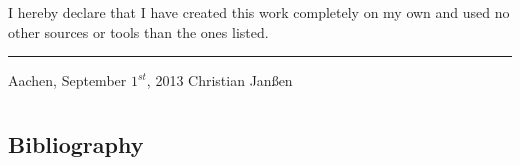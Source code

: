 \documentclass[final,twoside,11pt,titlepage,a4paper,english,bibliography=totocnumbered,listof=numbered]{scrbook}
\newcommand{\auth}{Christian Jan\ss en}
\begin{document}
I hereby declare that I have created this work completely on my own and used no other sources or tools than the ones listed.

\vspace{30 mm}

\begin{flushright}
	\rule{90mm}{1pt}

	Aachen, September $1^{st}$, 2013 \hspace{24 mm} \auth
\end{flushright}

%

%

\tableofcontents{}

\mainmatter

\part{}



\part{}


\part{}




\setwidesite{}

\begin{appendix} 

\addappheadtotoc

\chapter{Bibliography}
\label{cha:bibliography}
\printbibliography[heading=offline,filter=offline]
\printbibliography[heading=online,filter=online]






%

% 


\end{appendix}

\backmatter
\end{document}
